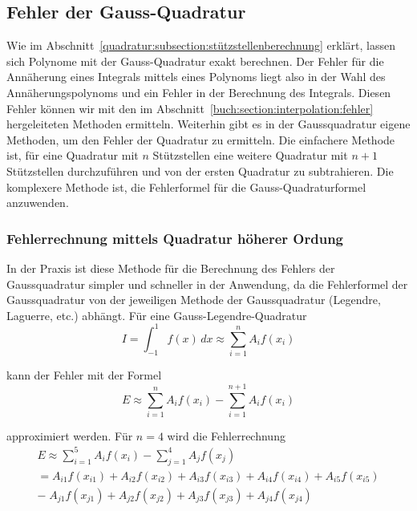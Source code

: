 \subsection{Fehler der Gauss-Quadratur
\label{quadratur:subsection:gaussfehler}}
Wie im Abschnitt~\ref{quadratur:subsection:stützstellenberechnung} erklärt,
lassen sich Polynome mit der Gauss-Quadratur exakt berechnen. 
Der Fehler für die Annäherung eines Integrals mittels eines Polynoms liegt
also in der Wahl des Annäherungspolynoms und ein Fehler in der Berechnung des Integrals.
Diesen Fehler können wir mit den im Abschnitt~\ref{buch:section:interpolation:fehler}
hergeleiteten Methoden ermitteln.
Weiterhin gibt es in der Gaussquadratur eigene Methoden, 
um den Fehler der Quadratur zu ermitteln. 
Die einfachere Methode ist, für eine Quadratur mit $n$ Stützstellen eine weitere
Quadratur mit $n+1$ Stützstellen durchzuführen und von der ersten Quadratur zu
subtrahieren. Die komplexere Methode ist, 
die Fehlerformel für die Gauss-Quadraturformel anzuwenden. 

\subsubsection{Fehlerrechnung mittels Quadratur höherer Ordung}

In der Praxis ist diese Methode für die Berechnung des Fehlers der Gaussquadratur
simpler und schneller in der Anwendung, da die Fehlerformel der Gaussquadratur
von der jeweiligen Methode der Gaussquadratur (Legendre, Laguerre, etc.) abhängt.
Für eine Gauss-Legendre-Quadratur 
\begin{equation}
    I 
    = 
    \int_{-1}^{1}f(x)\,dx 
    \approx 
    \sum_{i=1}^{n}A_{i}f(x_{i})
\end{equation}

kann der Fehler mit der Formel
\begin{equation}
    E 
    \approx 
    \sum_{i=1}^{n}A_{i}f(x_{i})
    -
    \sum_{i=1}^{n+1}A_{i}f(x_{i})
\end{equation}

approximiert werden. Für $n = 4$ wird die Fehlerrechnung 
\begin{gather*}
    E
    \approx
    \sum_{i=1}^{5}A_{i}f(x_{i})
    -
    \sum_{j=1}^{4}A_{j}f(x_{j}) \\
    =
    A_{i1}f(x_{i1})+A_{i2}f(x_{i2})+A_{i3}f(x_{i3})+A_{i4}f(x_{i4})+A_{i5}f(x_{i5}) \\
    -\;
    A_{j1}f(x_{j1})+A_{j2}f(x_{j2})+A_{j3}f(x_{j3})+A_{j4}f(x_{j4})
\end{gather*}

